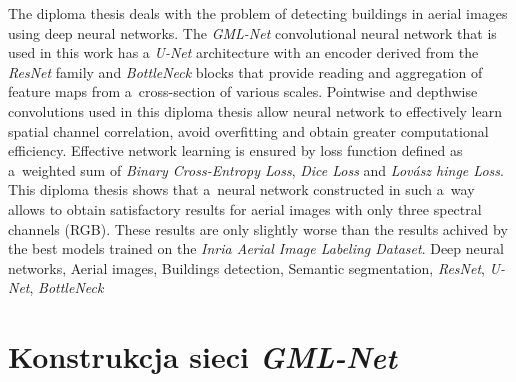 \documentclass[left=2.5cm, right=2.5cm, top=2.5cm, bottom=3cm, bindingoffset=6mm, nohyphenation=false]{Pakiety/thesis}
\begin{document}
\newpage
\abstract 
The diploma thesis deals with the problem of detecting buildings in aerial images using deep neural networks. The \textit{GML-Net} convolutional neural network that is used in this work has a \textit{U-Net} architecture with an encoder derived from the \textit{ResNet} family and \textit{BottleNeck} blocks that provide reading and aggregation of feature maps from a~cross-section of various scales. Pointwise and depthwise convolutions used in this diploma thesis allow neural network to effectively learn spatial channel correlation, avoid overfitting and obtain greater computational efficiency. Effective network learning is ensured by loss function defined as a~weighted sum of \textit{Binary Cross-Entropy Loss}, \textit{Dice Loss} and \textit{Lovász hinge Loss}. This diploma thesis shows that a~neural network constructed in such a~way allows to obtain satisfactory results for aerial images with only three spectral channels (RGB). These results are only slightly worse than the results achived by the best models trained on the \textit{Inria Aerial Image Labeling Dataset}.
\keywords Deep neural networks, Aerial images, Buildings detection, Semantic segmentation, \textit{ResNet}, \textit{U-Net}, \textit{BottleNeck}
\pagestyle{plain}

\cleardoublepage
\tableofcontents

\clearpage
\pagestyle{headings}


\clearpage


\clearpage


\clearpage
\section{Konstrukcja sieci \textit{GML-Net}}


\clearpage


\clearpage

                           
\clearpage
\newrefcontext[sorting=nty]
\printbibliography
\end{document}
